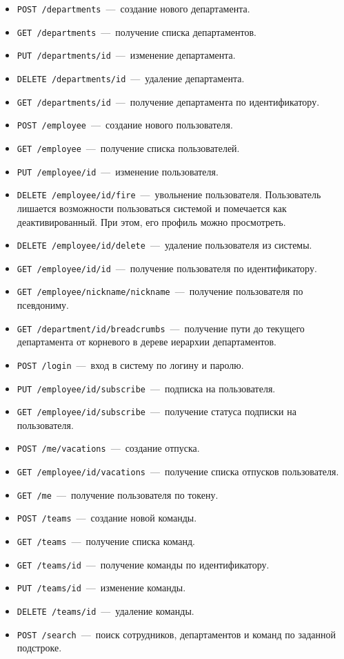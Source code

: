 \begin{itemize}
	\item \texttt{POST /departments}~---~создание нового департамента.
	\item \texttt{GET /departments}~---~получение списка департаментов.
	\item \texttt{PUT /departments/{id}}~---~изменение департамента.
	\item \texttt{DELETE /departments/{id}}~---~удаление департамента.
	\item \texttt{GET /departments/{id}}~---~получение департамента по идентификатору.
	\item \texttt{POST /employee}~---~создание нового пользователя.
	\item \texttt{GET /employee}~---~получение списка пользователей.
	\item \texttt{PUT /employee/{id}}~---~изменение пользователя.
	\item \texttt{DELETE /employee/{id}/fire}~---~увольнение пользователя. Пользователь лишается возможности пользоваться системой и помечается как деактивированный. При этом, его профиль можно просмотреть.
	\item \texttt{DELETE /employee/{id}/delete}~---~удаление пользователя из системы.
	\item \texttt{GET /employee/id/{id}}~---~получение пользователя по идентификатору.
	\item \texttt{GET /employee/nickname/{nickname}}~---~получение пользователя по псевдониму.
	\item \texttt{GET /department/{id}/breadcrumbs}~---~получение пути до текущего департамента от корневого в дереве иерархии департаментов.
	\item \texttt{POST /login}~---~вход в систему по логину и паролю.
	\item \texttt{PUT /employee/{id}/subscribe}~---~подписка на пользователя.
	\item \texttt{GET /employee/{id}/subscribe}~---~получение статуса подписки на пользователя.
	\item \texttt{POST /me/vacations}~---~создание отпуска.
	\item \texttt{GET /employee/{id}/vacations}~---~получение списка отпусков пользователя.
	\item \texttt{GET /me}~---~получение пользователя по токену.
	\item \texttt{POST /teams}~---~создание новой команды.
	\item \texttt{GET /teams}~---~получение списка команд.
	\item \texttt{GET /teams/{id}}~---~получение команды по идентификатору.
	\item \texttt{PUT /teams/{id}}~---~изменение команды.
	\item \texttt{DELETE /teams/{id}}~---~удаление команды.
	\item \texttt{POST /search}~---~поиск сотрудников, департаментов и команд по заданной подстроке.
\end{itemize}


